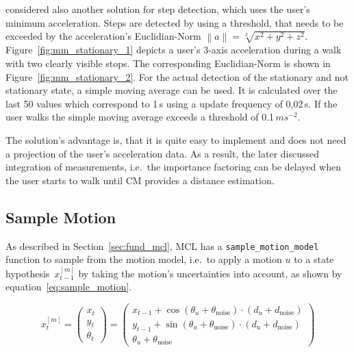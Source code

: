 \citet{shanklin:embedded_sensors} considered also another solution for step detection, which uses the user's minimum acceleration. Steps are detected by using a threshold, that needs to be exceeded by the acceleration's Euclidian-Norm $\left\lVert a \right\rVert = \sqrt[2]{x^{2}+y^{2}+z^{2}}$. Figure~\ref{fig:mm_stationary_1} depicts a user's 3-axis acceleration during a walk with two clearly visible stops. The corresponding Euclidian-Norm is shown in Figure~\ref{fig:mm_stationary_2}. For the actual detection of the stationary and not stationary state, a simple moving average can be used. It is calculated over the last 50 values which correspond to 1\,s using a update frequency of 0,02\,s. If the user walks the simple moving average exceeds a threshold of 0.1\,$ms^{-2}$.

The solution's advantage is, that it is quite easy to implement and does not need a projection of the user's acceleration data. As a result, the later discussed integration of measurements, i.e.\ the importance factoring can be delayed when the user starts to walk until \acs{CM} provides a distance estimation.
 


\subsection{Sample Motion}\label{sec:algo_sample_motion}
As described in Section~\ref{sec:fund_mcl}, \acs{MCL} has a \texttt{sample\_motion\_model} function to sample from the motion model, i.e.\ to apply a motion $u$ to a state hypothesis~$x^{[m]}_{t-1}$ by taking the motion's uncertainties into account, as shown by equation~\ref{eq:sample_motion}.

\begin{equation}\label{eq:sample_motion}
	x^{[m]}_t = \left(
    \begin{array}{c}
      x_t\\
      y_t\\
      \theta_t
    \end{array}
  \right) = \left(\begin{array}{c} x_{t-1} + \cos(\theta_u + \theta_{\text{noise}})\cdot (d_u + d_\text{noise}) \\ y_{t-1} + \sin(\theta_u + \theta_{\text{noise}})\cdot (d_u + d_\text{noise}) \\ \theta_u + \theta_{\text{noise}}
    \end{array}
  \right)
\end{equation}

